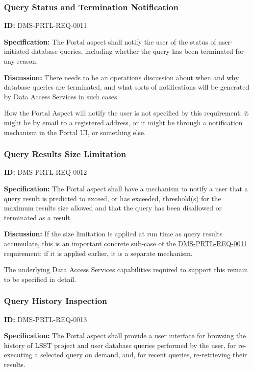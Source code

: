 \documentclass[SE,toc,lsstdraft]{lsstdoc}
\begin{document}
\subsubsection{Query Status and Termination Notification}

\label{DMS-PRTL-REQ-0011}
\textbf{ID:} DMS-PRTL-REQ-0011

\textbf{Specification:}
The Portal aspect shall notify the user of the status of user-initiated database queries, including whether the query has been terminated for any reason.

\textbf{Discussion:}
There needs to be an operations discussion about when and why database queries are terminated, and what sorts of notifications will be generated by Data Access Services in such cases.

How the Portal Aspect will notify the user is not specified by this requirement; it might be by email to a registered address, or it might be through a notification mechanism in the Portal UI, or something else.

\subsubsection{Query Results Size Limitation}

\label{DMS-PRTL-REQ-0012}
\textbf{ID:} DMS-PRTL-REQ-0012

\textbf{Specification:}
The Portal aspect shall have a mechanism to notify a user that a query result is predicted to exceed, or has exceeded, threshold(s) for the maximum results size allowed and that the query has been disallowed or terminated as a result.

\textbf{Discussion:}
If the size limitation is applied at run time as query results accumulate, this is an important concrete sub-case of the \hyperref[DMS-PRTL-REQ-0011]{DMS-PRTL-REQ-0011} requirement; if it is applied earlier, it is a separate mechanism.

The underlying Data Access Services capabilities required to support this remain to be specified in detail.

\subsubsection{Query History Inspection}

\label{DMS-PRTL-REQ-0013}
\textbf{ID:} DMS-PRTL-REQ-0013

\textbf{Specification:}
The Portal aspect shall provide a user interface for browsing the history of LSST project and user database queries performed by the user, for re-executing a selected query on demand, and, for recent queries, re-retrieving their results.
\end{document}
